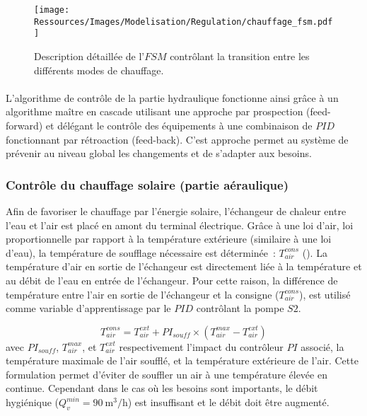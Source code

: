 \begin{figure}
    \centering
    \texttt{[image: Ressources/Images/Modelisation/Regulation/chauffage\_fsm.pdf]}
    \caption{Description détaillée de l’$FSM$ contrôlant la transition entre
             les différents modes de chauffage.
             \label{fig:automate_chauffage}}
\end{figure}


\paragraph{} %
\label{par:conclusion_algo}
L’algorithme de contrôle de la partie hydraulique fonctionne ainsi grâce à un algorithme
maître en cascade utilisant une approche par prospection (feed-forward) et délégant le
contrôle des équipements à une combinaison de $PID$ fonctionnant par rétroaction (feed-back).
C’est approche permet au système de prévenir au niveau global les changements et de
s’adapter aux besoins.


\subsubsection{Contrôle du chauffage solaire (partie aéraulique)} %
\label{ssub:controle_du_chauffage_solaire}
Afin de favoriser le chauffage par l’énergie solaire, l’échangeur de chaleur entre l’eau
et l’air est placé en amont du terminal électrique. Grâce à une loi d’air, loi
proportionnelle par rapport à la température extérieure (similaire à une loi d’eau), la
température de soufflage nécessaire est déterminée~: $T_{air}^{cons}$ ().
La température d’air en sortie de l’échangeur est directement liée à la température et au
débit de l’eau en entrée de l’échangeur. Pour cette raison, la différence de température
entre l’air en sortie de l’échangeur et la consigne ($T_{air}^{cons}$), est utilisé comme
variable d’apprentissage par le $PID$ contrôlant la pompe $S2$.

\begin{equation}\label{eq:temp_soufflage}
    T_{air}^{cons} = T_{air}^{ext} + PI_{souff} \times (T_{air}^{max} - T_{air}^{ext})
\end{equation}
avec $PI_{souff}$, $T_{air}^{max}$, et $T_{air}^{ext}$ respectivement l’impact du
contrôleur $PI$ associé, la température maximale de l’air soufflé, et la température
extérieure de l’air. Cette formulation permet d’éviter de souffler un air à une
température élevée en continue. Cependant dans le cas où les besoins sont importants, le
débit hygiénique ($Q_{v}^{min} = \SI[per-mode=symbol]{90}{\meter\cubed\per\hour}$) est insuffisant
et le débit doit être augmenté.

